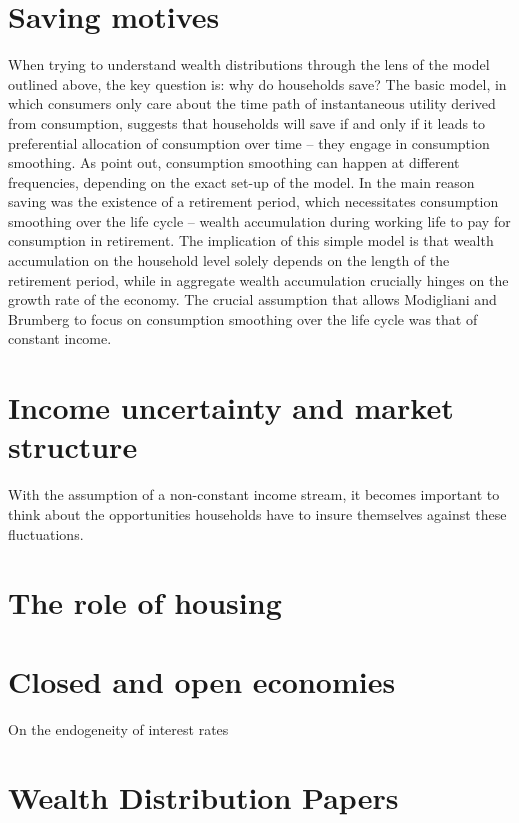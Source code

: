 \section{Saving motives}
When trying to understand wealth distributions through the lens of the model
outlined above, the key question is: why do households save? The basic model,
in which consumers only care about the time path of instantaneous utility 
derived from consumption, suggests that households will save if and only if
it leads to preferential allocation of consumption over time -- they engage 
in consumption smoothing. As \citet{BrowningCrossley2001} point out, consumption
smoothing can happen at different frequencies, depending on the exact set-up 
of the model. In \citet{ModiglianiBrumberg1954} the main reason saving was the
existence of a retirement period, which necessitates consumption smoothing over
the life cycle -- wealth accumulation during working life to pay for consumption
in retirement. The implication of this simple model is that wealth accumulation
on the household level solely depends on the length of the retirement period, 
while in aggregate wealth accumulation crucially hinges on the growth rate
of the economy. The crucial assumption that allows Modigliani and Brumberg to
focus on consumption smoothing over the life cycle was that of constant income.


\section{Income uncertainty and market structure}
With the assumption of a non-constant income stream, it becomes important to 
think about the opportunities households have to insure themselves against
these fluctuations. 

\section{The role of housing}
\citet{CampbellHercovitz2005}
\citet{Yang2009}
\citet{Iacoviello2008}

\section{Closed and open economies}
On the endogeneity of interest rates

\section{Wealth Distribution Papers}
\citet{HintermaierKoeniger2011}
\citet{CastanedaRiosRull2003}
\citet{DPMRR2003}
\citet{Cagetti2003}
\citet{Floden2008}
\citet{BenhabibBisinZhu2011}
\citet{DeNardiYang2015}

